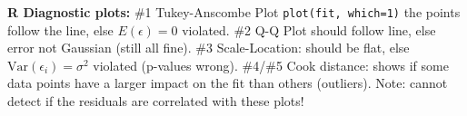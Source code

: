 \textbf{R Diagnostic plots: }
\#1 Tukey-Anscombe Plot \texttt{plot(fit, which=1)} the points follow the line, else $E(\epsilon)=0$ violated.
\#2 Q-Q Plot should follow line, else error not Gaussian (still all fine).
\#3 Scale-Location: should be flat, else $\text{Var}(\epsilon_i)=\sigma^2$ violated (p-values wrong).
\#4/\#5 Cook distance: shows if some data points have a larger impact on the fit than others (outliers).
Note: cannot detect if the residuals are correlated with these plots!
